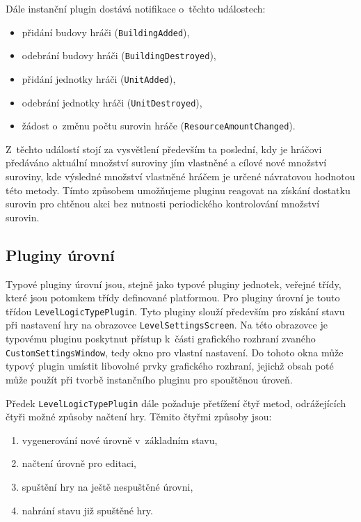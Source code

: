 Dále instanční plugin dostává notifikace o~těchto událostech:

\begin{itemize}
	\item přidání budovy hráči (\texttt{BuildingAdded}),
	\item odebrání budovy hráči (\texttt{BuildingDestroyed}),
	\item přidání jednotky hráči (\texttt{UnitAdded}),
	\item odebrání jednotky hráči (\texttt{UnitDestroyed}),
	\item žádost o~změnu počtu surovin hráče (\texttt{ResourceAmountChanged}).
\end{itemize}

Z~těchto událostí stojí za vysvětlení především ta poslední, kdy je hráčovi předáváno aktuální množství suroviny jím vlastněné a  cílové nové množství suroviny, kde výsledné množství vlastněné hráčem je určené návratovou hodnotou této metody. Tímto způsobem umožňujeme pluginu reagovat na získání dostatku surovin pro chtěnou akci bez nutnosti periodického kontrolování množství surovin.

\subsection{Pluginy úrovní}
Typové pluginy úrovní jsou, stejně jako typové pluginy jednotek, veřejné třídy, které jsou potomkem třídy definované platformou. Pro pluginy úrovní je touto třídou \texttt{LevelLogicTypePlugin}. Tyto pluginy slouží především pro získání stavu při nastavení hry na obrazovce \texttt{LevelSettingsScreen}. Na této obrazovce je typovému pluginu poskytnut přístup k~části grafického rozhraní zvaného \texttt{CustomSettingsWindow}, tedy okno pro vlastní nastavení. Do tohoto okna může typový plugin umístit libovolné prvky grafického rozhraní, jejichž obsah poté může použít při tvorbě instančního pluginu pro spouštěnou úroveň.

Předek \texttt{LevelLogicTypePlugin} dále požaduje přetížení čtyř metod, odrážejících čtyři možné způsoby načtení hry. Těmito čtyřmi způsoby jsou:

\begin{enumerate}
	\item vygenerování nové úrovně v~základním stavu,
	\item načtení úrovně pro editaci,
	\item spuštění hry na ještě nespuštěné úrovni,
	\item nahrání stavu již spuštěné hry.
\end{enumerate}


